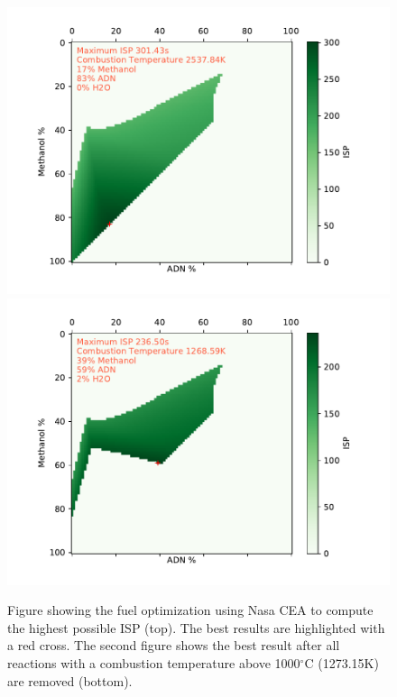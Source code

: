 \documentclass[12pt]{article}
\begin{document}
\newpage
\begin{figure}[!h]
	\centering
	\includegraphics[width=0.8\linewidth]{figures/b3_1.pdf}
	\includegraphics[width=0.8\linewidth]{figures/b3_2.pdf}
	\caption{Figure showing the fuel optimization using Nasa CEA to compute the highest possible ISP (top). The best results are highlighted with a red cross. The second figure shows the best result after all reactions with a combustion temperature above 1000$^\circ$C (1273.15K) are removed (bottom).}
	\label{fig:fuel_optimization_all_results}
\end{figure}
\end{document}
